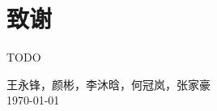 
\chapter{致谢}
	TODO
	

\vskip 108pt
\begin{flushright}
	王永锋，颜彬，李沐晗，何冠岚，张家豪 \\
\today
\end{flushright}

